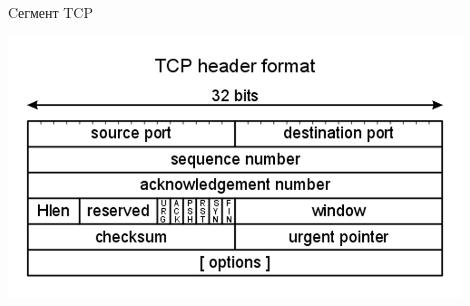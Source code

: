 \begin{frame}{Cегмент TCP}

	\center\includegraphics[width=0.9\textwidth]{../../slides/networking/net_TCP_head.png}

\end{frame}


